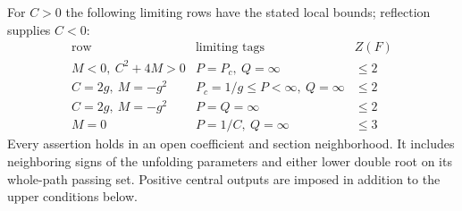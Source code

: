 \begin{proposition}
\label{rw:secondary:real}
For $C>0$ the following limiting rows have the stated local bounds;
reflection supplies $C<0$:
\[
\begin{array}{c|c|c}
\text{row}&\text{limiting tags}&Z(F)\\ \hline
 M<0,\ C^2+4M>0&P=P_c,\ Q=\infty&\le2\\
 C=2g,\ M=-g^2&P_c=1/g\le P<\infty,\ Q=\infty&\le2\\
 C=2g,\ M=-g^2&P=Q=\infty&\le2\\
 M=0&P=1/C,\ Q=\infty&\le3
\end{array}
\]
Every assertion holds in an open coefficient and section neighborhood.
It includes neighboring signs of the unfolding parameters and either
lower double root on its whole-path passing set. Positive central
outputs are imposed in addition to the upper conditions below.
\end{proposition}

